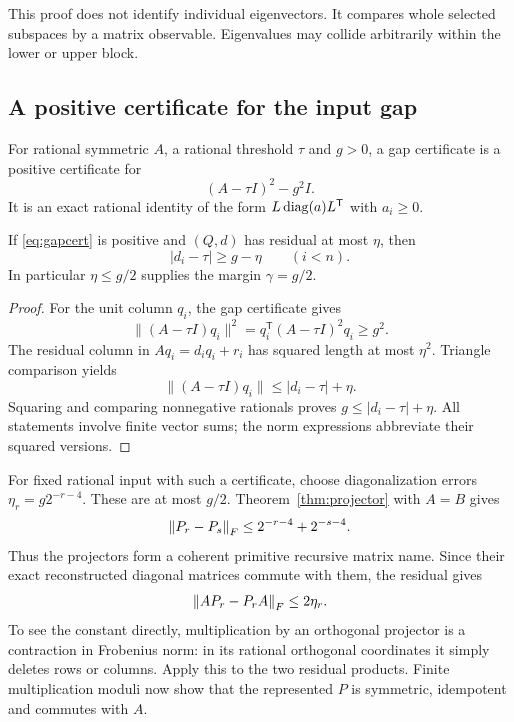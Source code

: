 This proof does not identify individual eigenvectors. It compares whole selected subspaces by a matrix observable. Eigenvalues may collide arbitrarily within the lower or upper block.

\subsection{A positive certificate for the input gap}

\begin{definition}
For rational symmetric $A$, a rational threshold $\tau$ and $g>0$, a gap certificate is a positive certificate for
\begin{equation}
 (A-\tau I)^2-g^2I.
 \label{eq:gapcert}
\end{equation}
It is an exact rational identity of the form $L\operatorname{diag}(a)L^{\mathsf T}$ with $a_i\ge0$.
\end{definition}

\begin{lemma}
\label{lem:gappass}
If \eqref{eq:gapcert} is positive and $(Q,d)$ has residual at most $\eta$, then
\[
 |d_i-\tau|\ge g-\eta\qquad(i<n).
\]
In particular $\eta\le g/2$ supplies the margin $\gamma=g/2$.
\end{lemma}
\begin{proof}
For the unit column $q_i$, the gap certificate gives
\[
 \|(A-\tau I)q_i\|^2
 =q_i^{\mathsf T}(A-\tau I)^2q_i\ge g^2.
\]
The residual column in $Aq_i=d_iq_i+r_i$ has squared length at most $\eta^2$. Triangle comparison yields
\[
 \|(A-\tau I)q_i\|\le|d_i-\tau|+\eta.
\]
Squaring and comparing nonnegative rationals proves $g\le|d_i-\tau|+\eta$. All statements involve finite vector sums; the norm expressions abbreviate their squared versions.
\end{proof}

For fixed rational input with such a certificate, choose diagonalization errors
$\eta_r=g2^{-r-4}$. These are at most $g/2$. Theorem~\ref{thm:projector} with $A=B$ gives
\[
 \left\lVert P_r-P_s\right\rVert_F\le2^{-r-4}+2^{-s-4}.
\]
Thus the projectors form a coherent primitive recursive matrix name. Since their exact reconstructed diagonal matrices commute with them, the residual gives
\[
 \left\lVert AP_r-P_rA\right\rVert_F\le2\eta_r.
\]
To see the constant directly, multiplication by an orthogonal projector is a contraction in Frobenius norm: in its rational orthogonal coordinates it simply deletes rows or columns. Apply this to the two residual products. Finite multiplication moduli now show that the represented $P$ is symmetric, idempotent and commutes with $A$.

